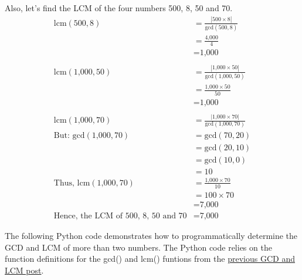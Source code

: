 \documentclass[
]{book}
\begin{document}
Also, let's find the LCM of the four numbers 500, 8, 50 and 70.
\[
\begin{aligned}
\text{lcm}(500, 8) &= \frac{|500 \times 8|}{\text{gcd}(500, 8)} \\
 &= \frac{\text{4,000}}{4} \\
 &= \text{1,000} \\
 \\
\text{lcm}(\text{1,000}, 50) &= \frac{|\text{1,000} \times 50|}{\text{gcd}(\text{1,000}, 50)} \\
 &= \frac{\text{1,000} \times 50}{50} \\
 &= \text{1,000} \\
 \\
\text{lcm}(\text{1,000}, 70) &= \frac{|\text{1,000} \times 70|}{\text{gcd}(\text{1,000}, 70)} \\
\text{But: gcd}(\text{1,000}, 70) &= \text{gcd}(70, 20) \\
 &= \text{gcd}(20, 10) \\
 &= \text{gcd}(10, 0) \\
 &= 10 \\
\text{Thus, lcm}(\text{1,000}, 70) &= \frac{\text{1,000} \times 70}{10} \\
 &= 100 \times 70 \\
 &= \text{7,000} \\
\text{Hence, the LCM of 500, 8, 50 and 70} &= \text{7,000}
\end{aligned}
\]

The following Python code demonstrates how to programmatically determine the GCD and LCM of more than two numbers. The Python code relies on the function definitions for the gcd() and lcm() funtions from the \href{https://sneurocode.github.io/math-explorations/gcd-and-lcm-1.html}{previous GCD and LCM post}.
\end{document}
